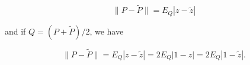 $$\|P - \tilde{P}\| = E_Q|z - \tilde{z}|$$

and if $Q = (P + \tilde{P})/2$, we have

$$\|P - \tilde{P}\| = E_Q|z - \tilde{z}| = 2E_Q|1 - z| = 2E_Q|1 - \tilde{z}|.$$
